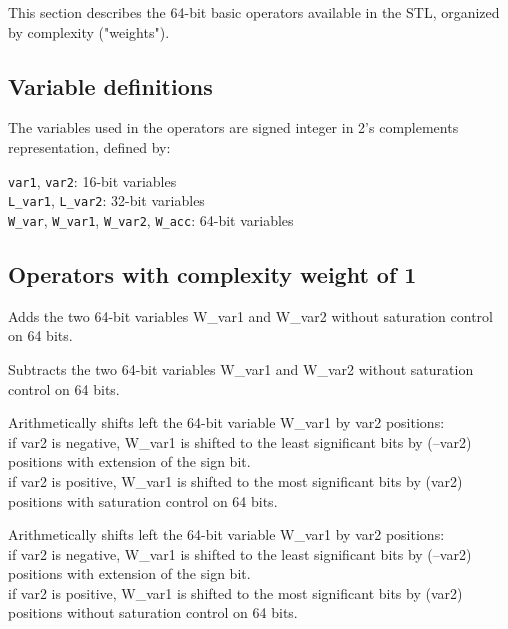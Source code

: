 This section describes the 64-bit basic operators available in the STL, organized by complexity ("weights").

\subsection{Variable definitions}

The variables used in the operators are signed integer in 2's complements representation, defined by:

{\tt var1}, {\tt var2}: 16-bit variables\\
{\tt L\_var1}, {\tt L\_var2}: 32-bit variables\\
{\tt W\_var}, {\tt W\_var1}, {\tt W\_var2}, {\tt W\_acc}: 64-bit variables


\subsection{Operators with complexity weight of 1}


Adds the two 64-bit variables W\_var1 and W\_var2 without saturation control on 64 bits.


Subtracts the two 64-bit variables W\_var1 and W\_var2 without saturation control on 64 bits.



Arithmetically shifts left the 64-bit variable W\_var1 by var2 positions:\\
if var2 is negative, W\_var1 is shifted to the least significant bits by (–var2) positions with extension of the sign bit.\\
if var2 is positive, W\_var1 is shifted to the most significant bits by (var2) positions with saturation control on 64 bits.



Arithmetically shifts left the 64-bit variable W\_var1 by var2 positions:\\
if var2 is negative, W\_var1 is shifted to the least significant bits by (–var2) positions with extension of the sign bit.\\
if var2 is positive, W\_var1 is shifted to the most significant bits by (var2) positions without saturation control on 64 bits.


